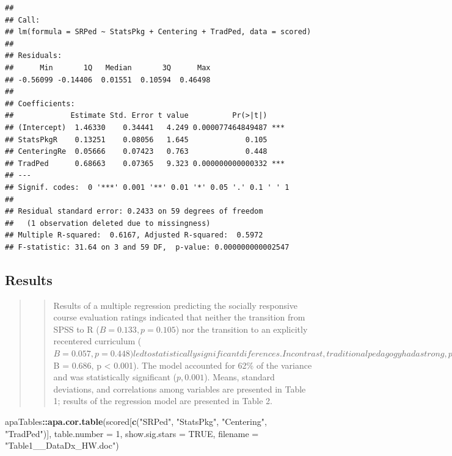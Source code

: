\documentclass[
  11pt,
]{book}
\newenvironment{Shaded}{\begin{snugshade}}{\end{snugshade}}
\newcommand{\AttributeTok}[1]{\textcolor[rgb]{0.27,0.27,0.27}{#1}}
\newcommand{\ConstantTok}[1]{\textcolor[rgb]{0.37,0.37,0.37}{#1}}
\newcommand{\DecValTok}[1]{\textcolor[rgb]{0.06,0.06,0.06}{#1}}
\newcommand{\FunctionTok}[1]{\textcolor[rgb]{0.27,0.27,0.27}{\textbf{#1}}}
\newcommand{\NormalTok}[1]{#1}
\newcommand{\SpecialCharTok}[1]{\textcolor[rgb]{0.43,0.43,0.43}{\textbf{#1}}}
\newcommand{\StringTok}[1]{\textcolor[rgb]{0.5,0.5,0.5}{#1}}
\begin{document}
\begin{verbatim}
## 
## Call:
## lm(formula = SRPed ~ StatsPkg + Centering + TradPed, data = scored)
## 
## Residuals:
##      Min       1Q   Median       3Q      Max 
## -0.56099 -0.14406  0.01551  0.10594  0.46498 
## 
## Coefficients:
##             Estimate Std. Error t value          Pr(>|t|)    
## (Intercept)  1.46330    0.34441   4.249 0.000077464849487 ***
## StatsPkgR    0.13251    0.08056   1.645             0.105    
## CenteringRe  0.05666    0.07423   0.763             0.448    
## TradPed      0.68663    0.07365   9.323 0.000000000000332 ***
## ---
## Signif. codes:  0 '***' 0.001 '**' 0.01 '*' 0.05 '.' 0.1 ' ' 1
## 
## Residual standard error: 0.2433 on 59 degrees of freedom
##   (1 observation deleted due to missingness)
## Multiple R-squared:  0.6167, Adjusted R-squared:  0.5972 
## F-statistic: 31.64 on 3 and 59 DF,  p-value: 0.000000000002547
\end{verbatim}

\hypertarget{results-2}{%
\subsection{Results}\label{results-2}}

\begin{quote}
\begin{quote}
Results of a multiple regression predicting the socially responsive course evaluation ratings indicated that neither the transition from SPSS to R (\(B = 0.133, p = 0.105\)) nor the transition to an explicitly recentered curriculum (\(B = 0.057, p = 0.448) led to statistically significant diferences. In contrast, traditional pedagogy had a strong, positive effect on evaluations of socially responsive pedagogy (\)B = 0.686, p \textless{} 0.001). The model accounted for 62\% of the variance and was statistically significant (\(p , 0.001\)). Means, standard deviations, and correlations among variables are presented in Table 1; results of the regression model are presented in Table 2.
\end{quote}
\end{quote}

\begin{Shaded}
\begin{Highlighting}[]
\NormalTok{apaTables}\SpecialCharTok{::}\FunctionTok{apa.cor.table}\NormalTok{(scored[}\FunctionTok{c}\NormalTok{(}\StringTok{"SRPed"}\NormalTok{, }\StringTok{"StatsPkg"}\NormalTok{, }\StringTok{"Centering"}\NormalTok{, }\StringTok{"TradPed"}\NormalTok{)],}
    \AttributeTok{table.number =} \DecValTok{1}\NormalTok{, }\AttributeTok{show.sig.stars =} \ConstantTok{TRUE}\NormalTok{, }\AttributeTok{filename =} \StringTok{"Table1\_\_DataDx\_HW.doc"}\NormalTok{)}
\end{Highlighting}
\end{Shaded}
\end{document}
